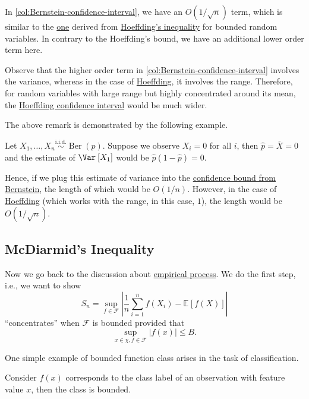 In \autoref{col:Bernstein-confidence-interval}, we have an \(O(1 / \sqrt{n} )\) term, which is similar to the \hyperref[rmk:Hoeffding-confidence-interval]{one} derived from \hyperref[thm:Hoeffding-inequality]{Hoeffding's inequality} for bounded random variables. In contrary to the Hoeffding's bound, we have an additional lower order term here.

\begin{remark}
	Observe that the higher order term in \autoref{col:Bernstein-confidence-interval} involves the variance, whereas in the case of \hyperref[rmk:Hoeffding-confidence-interval]{Hoeffding}, it involves the range. Therefore, for random variables with large range but highly concentrated around its mean, the \hyperref[rmk:Hoeffding-confidence-interval]{Hoeffding confidence interval} would be much wider.
\end{remark}

The above remark is demonstrated by the following example.

\begin{eg}
	Let \(X_1 , \dots , X_n \overset{\text{i.i.d.} }{\sim } \operatorname{Ber}(p) \). Suppose we observe \(X_i = 0\) for all \(i\), then \(\hat{p} = \overline{X} = 0\) and the estimate of \(\Var_{}\left[X_1 \right] \) would be \(\hat{p} (1 - \hat{p} ) = 0\).

	Hence, if we plug this estimate of variance into the \hyperref[col:Bernstein-confidence-interval]{confidence bound from Bernstein}, the length of which would be \(O(1 / n)\). However, in the case of \hyperref[rmk:Hoeffding-confidence-interval]{Hoeffding} (which works with the range, in this case, \(1\)), the length would be \(O(1 / \sqrt{n} )\).
\end{eg}

\subsection{McDiarmid's Inequality}
Now we go back to the discussion about \hyperref[def:EP]{empirical process}. We do the first step, i.e., we want to show
\[
	S_n = \sup _{f \in \mathscr{F} } \left\vert \frac{1}{n}\sum_{i=1}^{n} f(X_i) - \mathbb{E}_{}\left[f(X) \right]  \right\vert
\]
``concentrates'' when \(\mathscr{F} \) is bounded provided that
\[
	\sup _{x\in \chi , f\in \mathscr{F} } \vert f(x) \vert \leq B.
\]

One simple example of bounded function class arises in the task of classification.

\begin{eg}[Classification]
	Consider \(f(x)\) corresponds to the class label of an observation with feature value \(x\), then the class is bounded.
\end{eg}

